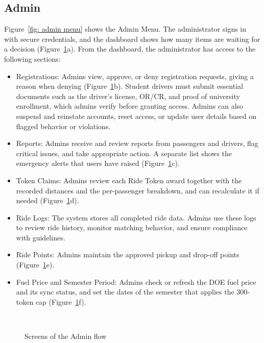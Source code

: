 \subsection{Admin}
\label{sec:flow-admin}
Figure~\ref{fig: admin menu} shows the Admin Menu. The administrator signs in with secure credentials, and the dashboard shows how many items are waiting for a decision (Figure~\ref{fig:ui-admin}a). From the dashboard, the administrator has access to the following sections:
\begin{itemize}
    \item Registrations: Admins view, approve, or deny registration requests, giving a reason when denying (Figure~\ref{fig:ui-admin}b). Student drivers must submit essential documents such as the driver's license, OR/CR, and proof of university enrollment, which admins verify before granting access. Admins can also suspend and reinstate accounts, reset access, or update user details based on flagged behavior or violations.
    \item Reports: Admins receive and review reports from passengers and drivers, flag critical issues, and take appropriate action. A separate list shows the emergency alerts that users have raised (Figure~\ref{fig:ui-admin}c).
    \item Token Claims: Admins review each Ride Token award together with the recorded distances and the per-passenger breakdown, and can recalculate it if needed (Figure~\ref{fig:ui-admin}d).
    \item Ride Logs: The system stores all completed ride data. Admins use these logs to review ride history, monitor matching behavior, and ensure compliance with guidelines.
    \item Ride Points: Admins maintain the approved pickup and drop-off points (Figure~\ref{fig:ui-admin}e).
    \item Fuel Price and Semester Period: Admins check or refresh the DOE fuel price and its sync status, and set the dates of the semester that applies the 300-token cap (Figure~\ref{fig:ui-admin}f).
\end{itemize}


    \begin{figure}[htbp]
        \centering
        \hfill
        \hfill
        \\[6pt]
        \hfill
        \hfill
        \caption{Screens of the Admin flow}
        \label{fig:ui-admin}
    \end{figure}

